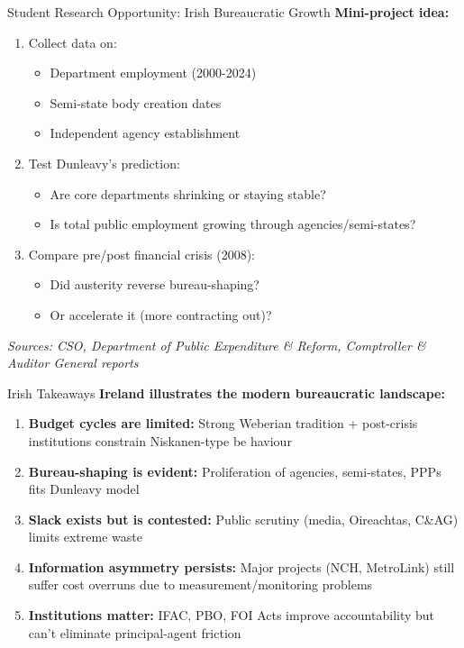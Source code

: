 \documentclass[10pt]{beamer}
\begin{document}
\begin{frame}{Student Research Opportunity: Irish Bureaucratic Growth}
\textbf{Mini-project idea:}

\begin{enumerate}
\item Collect data on:
\begin{itemize}
\item Department employment (2000-2024)
\item Semi-state body creation dates
\item Independent agency establishment
\end{itemize}

\item Test Dunleavy's prediction:
\begin{itemize}
\item Are core departments shrinking or staying stable?
\item Is total public employment growing through agencies/semi-states?
\end{itemize}

\item Compare pre/post financial crisis (2008):
\begin{itemize}
\item Did austerity reverse bureau-shaping?
\item Or accelerate it (more contracting out)?
\end{itemize}
\end{enumerate}


\footnotesize
\textit{Sources: CSO, Department of Public Expenditure \& Reform, Comptroller \& Auditor General reports}
\end{frame}

\begin{frame}{Irish Takeaways}
\textbf{Ireland illustrates the modern bureaucratic landscape:}

\begin{enumerate}
\item \textbf{Budget cycles are limited:} Strong Weberian tradition + post-crisis institutions constrain Niskanen-type be haviour

\item \textbf{Bureau-shaping is evident:} Proliferation of agencies, semi-states, PPPs fits Dunleavy model

\item \textbf{Slack exists but is contested:} Public scrutiny (media, Oireachtas, C\&AG) limits extreme waste

\item \textbf{Information asymmetry persists:} Major projects (NCH, MetroLink) still suffer cost overruns due to measurement/monitoring problems

\item \textbf{Institutions matter:} IFAC, PBO, FOI Acts improve accountability but can't eliminate principal-agent friction
\end{enumerate}
\end{frame}
\end{document}
